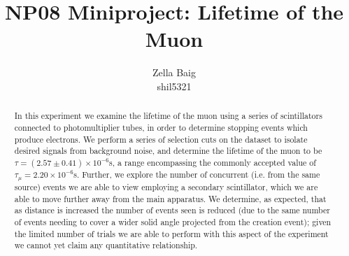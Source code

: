 \documentclass[a4paper]{article}
\title{\color{purply} \Huge NP08 Miniproject: Lifetime of the Muon}
\author{\LARGE  Zella Baig\\
shil5321}
\begin{document}
\maketitle
\thispagestyle{empty}
\begin{abstract}
	\noindent In
	this experiment we examine the lifetime of the muon using a series of scintillators connected to photomultiplier tubes, in order to determine stopping events which produce electrons. We perform a series of selection cuts on the dataset to isolate desired signals from background noise, and determine the lifetime of the muon to be $\tau = (2.57 \pm 0.41) \times 10^{-6}$s, a range encompassing the commonly accepted value of $\tau_\mu = 2.20 \times 10^{-6}$s. Further, we explore the number of concurrent (i.e. from the same source) events we are able to view employing a secondary scintillator, which we are able to move further away from the main apparatus. We determine, as expected, that as distance is increased the number of events seen is reduced (due to the same number of events needing to cover a wider solid angle projected from the creation event); given the limited number of trials we are able to perform with this aspect of the experiment we cannot yet claim any quantitative relationship.
\end{abstract}
\newpage
\tableofcontents
\thispagestyle{empty}
\newpage
\setcounter{page}{1}
\end{document}

